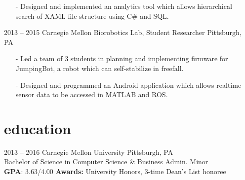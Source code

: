 \documentclass[print]{template/friggeri-cv}
\begin{document}
\begin{entrylist}
{\begin{itemize}[leftmargin=*,itemsep=4pt]
                \item[-] Designed and implemented an analytics tool which allows hierarchical search of XAML file structure using C\# and SQL.
             \end{itemize}}
        \entry
            {2013 -- 2015}
            {Carnegie Mellon Biorobotics Lab, {\normalfont Student Researcher}}
            {Pittsburgh, PA}
            {\vspace{6pt} \begin{itemize}[leftmargin=*,itemsep=4pt]
                \item[-] Led a team of 3 students in planning and implementing firmware for JumpingBot, a robot which can self-stabilize in freefall.
                \item[-] Designed and programmed an Android application which allows realtime sensor data to be accessed in MATLAB and ROS.
            \end{itemize}}
    \end{entrylist}

    \section{education}

    \begin{entrylist}
        \entry
            {2013 -- 2016}
            {Carnegie Mellon University}
            {Pittsburgh, PA}
            {\\ Bachelor of Science in Computer Science \& Business Admin. Minor\\
            \textbf{GPA}: 3.63/4.00 \textbf{Awards:} University Honors, 3-time Dean's List honoree}
    \end{entrylist}
\end{document}
